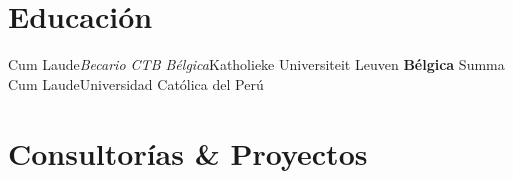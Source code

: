 \documentclass[10pt,a4paper, sans, unicode]{moderncv} %
\begin{document}
\makecvtitle %

\justifying
\section{Educación}

 {Cum Laude}{\textit{Becario CTB Bélgica}}{Katholieke Universiteit Leuven \textbf{Bélgica}}{}{}
 {Summa Cum Laude}{Universidad Católica del Perú}{}{}

\section{Consultorías \& Proyectos}
\end{document}
